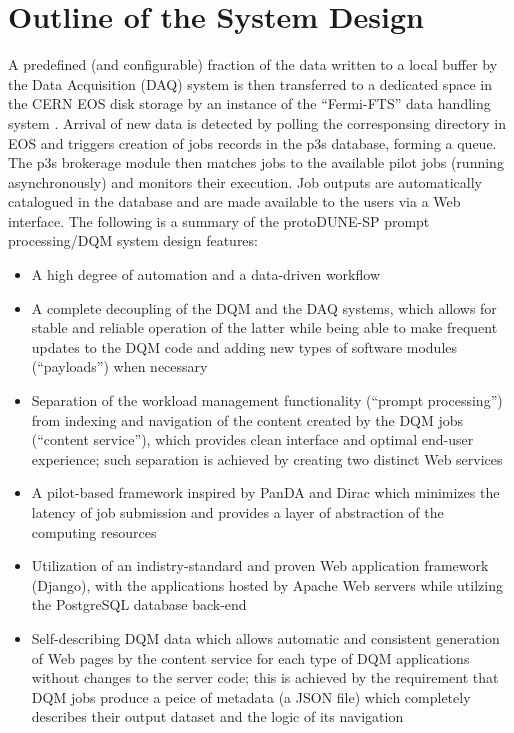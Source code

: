 \documentclass{webofc}
\newcommand{\pd}{protoDUNE\xspace}
\begin{document}
\section{Outline of the System Design}
\label{sec:outline}

A predefined (and configurable) fraction of the data written to a local buffer
by the  Data Acquisition (DAQ) system is then transferred to a dedicated space
in the  CERN EOS disk storage  \cite{castoreos} by an instance of the ``Fermi-FTS''
data handling system \cite{fts}. Arrival of new data is detected by polling the
corresponsing directory in EOS and triggers creation of jobs records in the
p3s database, forming a queue. The p3s brokerage module
then matches jobs to the available pilot jobs (running asynchronously) and monitors
their execution. Job outputs are automatically catalogued in the database and
are made available to the users via a Web interface.
The following is a summary  of the \pd-SP prompt processing/DQM system design features\cite{chep18}:
\begin{itemize}

\item A high degree of automation and a data-driven workflow

\item A complete decoupling of the DQM and the DAQ systems, which allows
for stable and reliable operation of the latter while being able to make frequent updates to the
DQM code and adding new types of software modules (``payloads'') when necessary

\item Separation of the workload management functionality (``prompt processing'') from
indexing and navigation of the content created by the DQM  jobs (``content service''), which provides clean
interface and optimal end-user experience; such separation is achieved by creating two
distinct Web services

\item A pilot-based framework inspired by PanDA and Dirac \cite{panda,dirac}
which minimizes the latency of job submission and provides a layer of abstraction of the computing resources

\item Utilization of an indistry-standard and proven Web application framework (Django)\cite{django},
with the applications hosted by Apache Web servers while utilzing the PostgreSQL database
back-end

\item Self-describing DQM data which allows automatic and consistent generation of Web pages
by the content service
for each type of DQM applications without changes to the server code; this is achieved by the
requirement that DQM jobs produce a peice of metadata (a JSON file) which completely
describes their output dataset and the logic of its navigation

\end{itemize}
\end{document}
